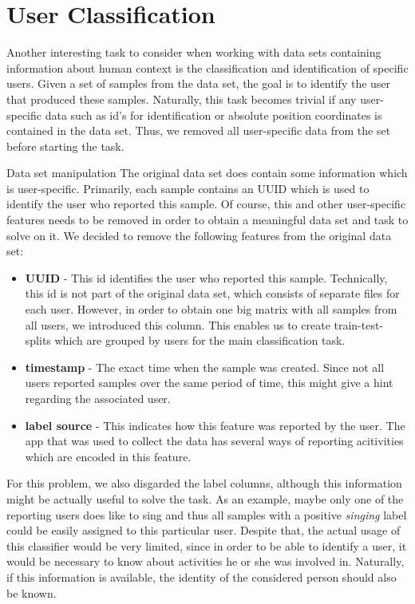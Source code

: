 \section{User Classification}
Another interesting task to consider when working with data sets containing information about human context is the classification and identification of specific users. Given a set of samples from the data set, the goal is to identify the user that produced these samples. Naturally, this task becomes trivial if any user-specific data such as id's for identification or absolute position coordinates is contained in the data set. Thus, we removed all user-specific data from the set before starting the task.

\begin{subsection}{Data set manipulation}
	The original data set does contain some information which is user-specific. Primarily, each sample contains an UUID which is used to identify the user who reported this sample. Of course, this and other user-specific features needs to be removed in order to obtain a meaningful data set and task to solve on it. We decided to remove the following features from the original data set:
	\begin{itemize}
		\item \textbf{UUID} - This id identifies the user who reported this sample. Technically, this id is not part of the original data set, which consists of separate files for each user. However, in order to obtain one big matrix with all samples from all users, we introduced this column. This enables us to create train-test-splits which are grouped by users for the main classification task.
		\item \textbf{timestamp} - The exact time when the sample was created. Since not all users reported samples over the same period of time, this might give a hint regarding the associated user.
		\item \textbf{label source} - This indicates how this feature was reported by the user. The app that was used to collect the data has several ways of reporting acitivities which are encoded in this feature.
	\end{itemize}
	For this problem, we also disgarded the label columns, although this information might be actually useful to solve the task. As an example, maybe only one of the reporting users does like to sing and thus all samples with a positive \emph{singing} label could be easily assigned to this particular user. Despite that, the actual usage of this classifier would be very limited, since in order to be able to identify a user, it would be necessary to know about activities he or she was involved in. Naturally, if this information is available, the identity of the considered person should also be known.
\end{subsection}
